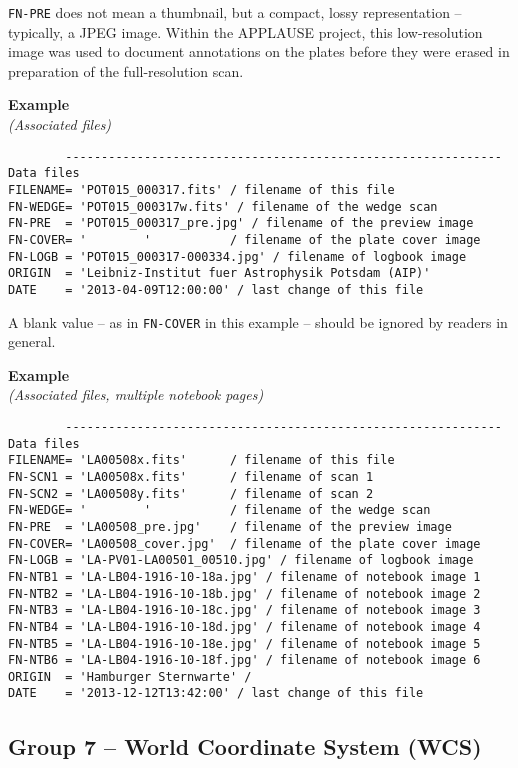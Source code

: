 \documentclass[11pt]{ivoa}
\newcommand\cardname[1]{\texttt{\color{keyword}#1}}
\newenvironment{fitsexample}[1]
{\bigskip\noindent\textbf{Example}\\\textit{(#1\smallskip)}}
{\medskip}
\begin{document}
\cardname{FN-PRE} does not mean a thumbnail, but a compact, lossy
representation -- typically, a JPEG image.  Within the APPLAUSE project,
this low-resolution image was used to document annotations on the plates
before they were erased in preparation of the full-resolution scan.


\begin{fitsexample}{Associated files}
\begin{lstlisting}
        ------------------------------------------------------------- Data files
FILENAME= 'POT015_000317.fits' / filename of this file
FN-WEDGE= 'POT015_000317w.fits' / filename of the wedge scan
FN-PRE  = 'POT015_000317_pre.jpg' / filename of the preview image
FN-COVER= '        '           / filename of the plate cover image
FN-LOGB = 'POT015_000317-000334.jpg' / filename of logbook image
ORIGIN  = 'Leibniz-Institut fuer Astrophysik Potsdam (AIP)'
DATE    = '2013-04-09T12:00:00' / last change of this file
\end{lstlisting}
\end{fitsexample}

A blank value -- as in \cardname{FN-COVER} in this example -- should be
ignored by readers in general.


\begin{fitsexample}{Associated files, multiple notebook pages}
\begin{lstlisting}
        ------------------------------------------------------------- Data files
FILENAME= 'LA00508x.fits'      / filename of this file
FN-SCN1 = 'LA00508x.fits'      / filename of scan 1
FN-SCN2 = 'LA00508y.fits'      / filename of scan 2
FN-WEDGE= '        '           / filename of the wedge scan
FN-PRE  = 'LA00508_pre.jpg'    / filename of the preview image
FN-COVER= 'LA00508_cover.jpg'  / filename of the plate cover image
FN-LOGB = 'LA-PV01-LA00501_00510.jpg' / filename of logbook image
FN-NTB1 = 'LA-LB04-1916-10-18a.jpg' / filename of notebook image 1
FN-NTB2 = 'LA-LB04-1916-10-18b.jpg' / filename of notebook image 2
FN-NTB3 = 'LA-LB04-1916-10-18c.jpg' / filename of notebook image 3
FN-NTB4 = 'LA-LB04-1916-10-18d.jpg' / filename of notebook image 4
FN-NTB5 = 'LA-LB04-1916-10-18e.jpg' / filename of notebook image 5
FN-NTB6 = 'LA-LB04-1916-10-18f.jpg' / filename of notebook image 6
ORIGIN  = 'Hamburger Sternwarte' /
DATE    = '2013-12-12T13:42:00' / last change of this file
\end{lstlisting}
\end{fitsexample}

\subsection{Group 7 – World Coordinate System (WCS)}
\end{document}
